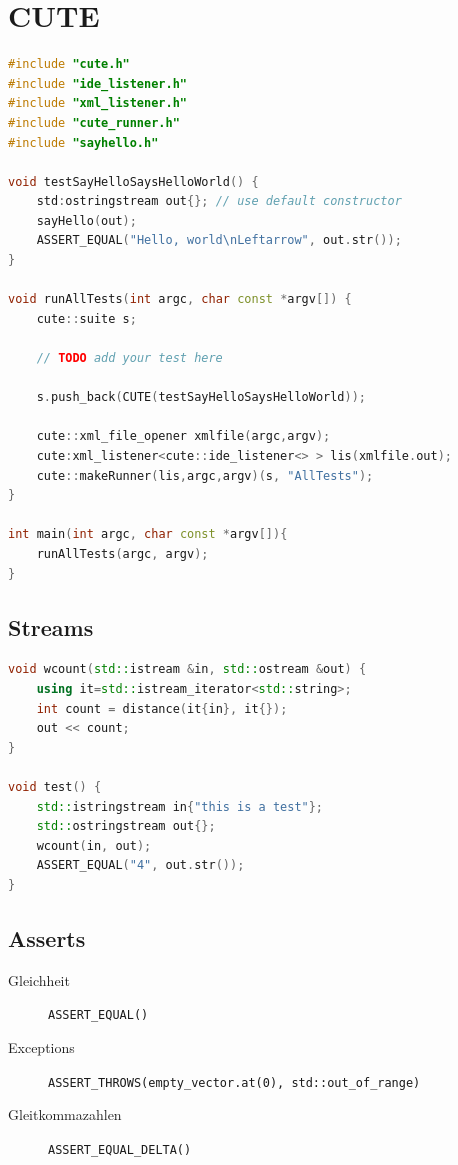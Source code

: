 \section{CUTE}
\begin{lstlisting}[language=C++, caption=Basic CUTE Test File]
#include "cute.h"
#include "ide_listener.h"
#include "xml_listener.h"
#include "cute_runner.h"
#include "sayhello.h"

void testSayHelloSaysHelloWorld() {
	std:ostringstream out{}; // use default constructor
	sayHello(out);
	ASSERT_EQUAL("Hello, world\nLeftarrow", out.str());
}

void runAllTests(int argc, char const *argv[]) {
	cute::suite s;
	
	// TODO add your test here
	
	s.push_back(CUTE(testSayHelloSaysHelloWorld));
	
	cute::xml_file_opener xmlfile(argc,argv);
	cute:xml_listener<cute::ide_listener<> > lis(xmlfile.out);
	cute::makeRunner(lis,argc,argv)(s, "AllTests");
}

int main(int argc, char const *argv[]){
	runAllTests(argc, argv);
}
\end{lstlisting}

\subsection{Streams}
\begin{lstlisting}[language=C++, caption=Test IO Stream]
void wcount(std::istream &in, std::ostream &out) {
	using it=std::istream_iterator<std::string>;
	int count = distance(it{in}, it{});
	out << count;
}

void test() {
	std::istringstream in{"this is a test"};
	std::ostringstream out{};
	wcount(in, out);
	ASSERT_EQUAL("4", out.str());
}

\end{lstlisting}

\subsection{Asserts}
\begin{description}
	\item[Gleichheit] \lstinline|ASSERT_EQUAL()|
	\item[Exceptions] \lstinline|ASSERT_THROWS(empty_vector.at(0), std::out_of_range)|
	\item[Gleitkommazahlen] \lstinline|ASSERT_EQUAL_DELTA()|
\end{description}


